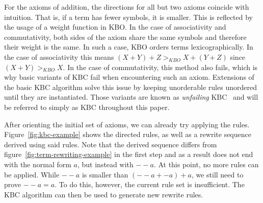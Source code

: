 For the axioms of addition, the directions for all but two axioms coincide with intuition. That is, if a term has fewer symbols, it is smaller. This is reflected by the usage of a weight function in KBO. In the case of associativity and commutativity, both sides of the axiom share the same symbols and therefore their weight is the same. In such a case, KBO orders terms lexicographically. In the case of associativity this means $(X + Y) + Z >_{KBO} X + (Y + Z)$ since $(X + Y) >_{KBO} X$. In the case of commutativity, this method also fails, which is why basic variants of KBC fail when encountering such an axiom. Extensions of the basic KBC algorithm solve this issue by keeping unorderable rules unordered until they are instantiated. Those variants are known as \emph{unfailing} KBC~\citep{10.1093/comjnl/34.1.2} and will be referred to simply as KBC throughout this paper.

After orienting the initial set of axioms, we can already try applying the rules. Figure~\ref{fig:kbc-example} shows the directed rules, as well as a rewrite sequence derived using said rules. Note that the derived sequence differs from figure~\ref{fig:term-rewriting-example} in the first step and as a result does not end with the normal form $a$, but instead with $--a$. At this point, no more rules can be applied. While $--a$ is smaller than $(--a + -a) + a$, we still need to prove $--a = a$. To do this, however, the current rule set is insufficient. The KBC algorithm can then be used to generate new rewrite rules.

